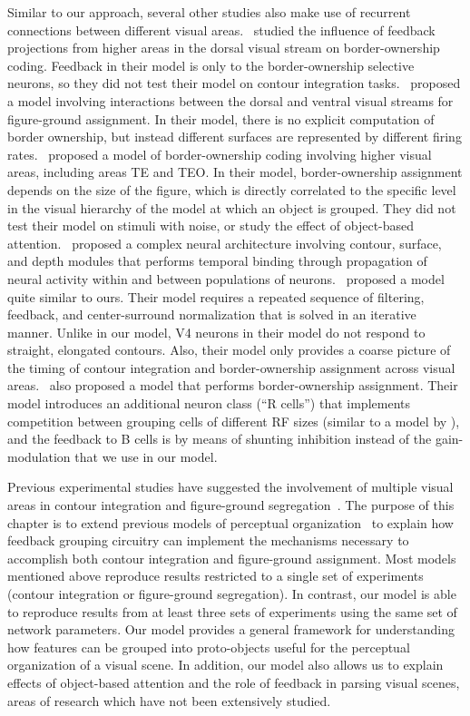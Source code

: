 Similar to our approach, several other studies also make use of recurrent connections between different visual areas.~\citet{Zwickel_etal07} studied the influence of feedback projections from higher areas in the dorsal visual stream on border-ownership coding. Feedback in their model is only to the border-ownership selective neurons, so they did not test their model
on contour integration tasks.~\citet{Domijan_Setic08} proposed a model
involving interactions between the dorsal and ventral visual streams
for figure-ground assignment. In their model, there is no explicit
computation of border ownership, but instead different surfaces are
represented by different firing rates.~\citet{Jehee_etal07b} proposed
a model of border-ownership coding involving higher visual areas,
including areas TE and TEO. In their model, border-ownership assignment depends on the size of the figure, which is directly correlated to the specific level in the visual hierarchy of the model at which an object is grouped. They did not test their model on stimuli with noise, or study the effect of object-based attention.~\citet{Sajda_Finkel95} proposed a complex neural architecture involving contour, surface, and depth modules that performs temporal binding through propagation of neural activity within and between populations of neurons.~\citet{Tschechne_Neumann14} proposed a model quite similar to ours. Their model requires a repeated sequence of filtering, feedback, and center-surround normalization that is solved in an iterative manner. Unlike in our model, V4 neurons in their model do not respond to straight, elongated contours. Also, their model only provides a coarse picture of the timing of contour integration and border-ownership assignment across visual areas.~\citet{Layton_etal12} also proposed a model that performs border-ownership assignment. Their model introduces an additional neuron class (``R cells'') that implements competition between grouping cells of different RF sizes
(similar to a model by \citet{Ardila_etal12}), and the feedback to B
cells is by means of shunting inhibition instead of the gain-modulation that we use in our model.

Previous experimental studies have suggested the involvement of
multiple visual areas in contour integration and figure-ground
segregation~\citep{Poort_etal12,Chen_etal14}.  The purpose of this chapter
is to extend previous models of perceptual
organization~\citep{Craft_etal07,Mihalas_etal11b} to explain how
feedback grouping circuitry can implement the mechanisms necessary to
accomplish both contour integration and figure-ground assignment.
Most models mentioned above reproduce results restricted to a single
set of experiments (\eg contour integration or figure-ground segregation). In contrast, our model is able to reproduce results from
at least three sets of experiments using the same set of network parameters. Our model provides a general framework for understanding
how features can be grouped into proto-objects useful for the perceptual organization of a visual scene. In addition, our model also
allows us to explain effects of object-based attention and the role of
feedback in parsing visual scenes, areas of research which have not
been extensively studied.

